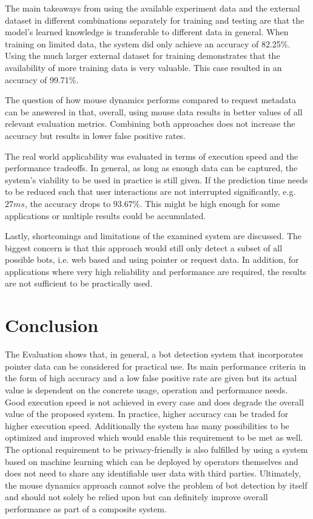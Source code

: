 \documentclass[
    fontsize=12pt,
    headings=small,
    parskip=half,           %
    bibliography=totoc,
    numbers=noenddot,       %
    open=any,               %
    final,                   %
    table
]{scrreprt}
\begin{document}
The main takeaways from using the available experiment data and the external dataset in different combinations separately for training and testing are that the model's learned knowledge is transferable to different data in general. When training on limited data, the system did only achieve an accuracy of 82.25\%. Using the much larger external dataset for training demonstrates that the availability of more training data is very valuable. This case resulted in an accuracy of 99.71\%.

The question of how mouse dynamics performs compared to request metadata can be answered in that, overall, using mouse data results in better values of all relevant evaluation metrics. Combining both approaches does not increase the accuracy but results in lower false positive rates.

The real world applicability was evaluated in terms of execution speed and the performance tradeoffs. In general, as long as enough data can be captured, the system's viability to be used in practice is still given. If the prediction time needs to be reduced such that user interactions are not interrupted significantly, e.g. $27ms$, the accuracy drops to $93.67\%$. This might be high enough for some applications or multiple results could be accumulated.

Lastly, shortcomings and limitations of the examined system are discussed. The biggest concern is that this approach would still only detect a subset of all possible bots, i.e. web based and using pointer or request data. In addition, for applications where very high reliability and performance are required, the results are not sufficient to be practically used.

\label{sec:conclusion}
\chapter{Conclusion}

The Evaluation shows that, in general, a bot detection system that incorporates pointer data can be considered for practical use. Its main performance criteria in the form of high accuracy and a low false positive rate are given but its actual value is dependent on the concrete usage, operation and performance needs. Good execution speed is not achieved in every case and does degrade the overall value of the proposed system. In practice, higher accuracy can be traded for higher execution speed. Additionally the system has many possibilities to be optimized and improved which would enable this requirement to be met as well. The optional requirement to be privacy-friendly is also fulfilled by using a system based on machine learning which can be deployed by operators themselves and does not need to share any identifiable user data with third parties. Ultimately, the mouse dynamics approach cannot solve the problem of bot detection by itself and should not solely be relied upon but can definitely improve overall performance as part of a composite system.
\end{document}
